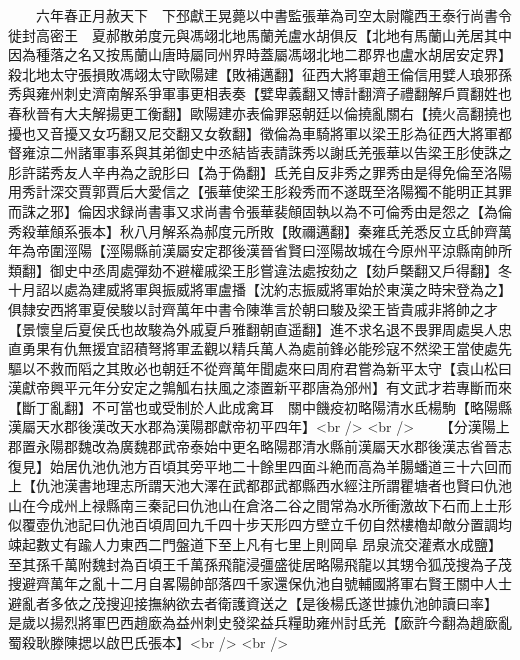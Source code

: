 　　六年春正月赦天下　下邳獻王晃薨以中書監張華為司空太尉隴西王泰行尚書令徙封高密王　夏郝散弟度元與馮翊北地馬蘭羌盧水胡俱反【北地有馬蘭山羌居其中因為種落之名又按馬蘭山唐時屬同州界時蓋屬馮翊北地二郡界也盧水胡居安定界】殺北地太守張損敗馮翊太守歐陽建【敗補邁翻】征西大將軍趙王倫信用嬖人琅邪孫秀與雍州刺史濟南解系爭軍事更相表奏【嬖卑義翻又博計翻濟子禮翻解戶買翻姓也春秋晉有大夫解揚更工衡翻】歐陽建亦表倫罪惡朝廷以倫撓亂關右【撓火高翻撓也擾也又音擾又女巧翻又尼交翻又女敎翻】徵倫為車騎將軍以梁王肜為征西大將軍都督雍涼二州諸軍事系與其弟御史中丞結皆表請誅秀以謝氐羌張華以告梁王肜使誅之肜許諾秀友人辛冉為之說肜曰【為于偽翻】氐羌自反非秀之罪秀由是得免倫至洛陽用秀計深交賈郭賈后大愛信之【張華使梁王肜殺秀而不遂既至洛陽獨不能明正其罪而誅之邪】倫因求録尚書事又求尚書令張華裴頠固執以為不可倫秀由是怨之【為倫秀殺華頠系張本】秋八月解系為郝度元所敗【敗禰邁翻】秦雍氐羌悉反立氐帥齊萬年為帝圍涇陽【涇陽縣前漢屬安定郡後漢晉省賢曰涇陽故城在今原州平涼縣南帥所類翻】御史中丞周處彈劾不避權戚梁王肜嘗違法處按劾之【劾戶槩翻又戶得翻】冬十月詔以處為建威將軍與振威將軍盧播【沈約志振威將軍始於東漢之時宋登為之】俱隸安西將軍夏侯駿以討齊萬年中書令陳準言於朝曰駿及梁王皆貴戚非將帥之才【景懷皇后夏侯氏也故駿為外戚夏戶雅翻朝直遥翻】進不求名退不畏罪周處吳人忠直勇果有仇無援宜詔積弩將軍孟觀以精兵萬人為處前鋒必能殄寇不然梁王當使處先驅以不救而䧟之其敗必也朝廷不從齊萬年聞處來曰周府君嘗為新平太守【袁山松曰漢獻帝興平元年分安定之鶉觚右扶風之漆置新平郡唐為邠州】有文武才若專斷而來【斷丁亂翻】不可當也或受制於人此成禽耳　關中饑疫初略陽清水氐楊駒【略陽縣漢屬天水郡後漢改天水郡為漢陽郡獻帝初平四年】<br />
<br />
　　【分漢陽上郡置永陽郡魏改為廣魏郡武帝泰始中更名略陽郡清水縣前漢屬天水郡後漢志省晉志復見】始居仇池仇池方百頃其旁平地二十餘里四面斗絶而高為羊腸蟠道三十六回而上【仇池漢書地理志所謂天池大澤在武都郡武都縣西水經注所謂瞿塘者也賢曰仇池山在今成州上禄縣南三秦記曰仇池山在倉洛二谷之間常為水所衝激故下石而上土形似覆壺仇池記曰仇池百頃周回九千四十步天形四方壁立千仞自然樓櫓却敵分置調均竦起數丈有踰人力東西二門盤道下至上凡有七里上則岡阜昂泉流交灌煮水成鹽】至其孫千萬附魏封為百頃王千萬孫飛龍浸彊盛徙居略陽飛龍以其甥令狐茂搜為子茂搜避齊萬年之亂十二月自畧陽帥部落四千家還保仇池自號輔國將軍右賢王關中人士避亂者多依之茂搜迎接撫納欲去者衛護資送之【是後楊氏遂世據仇池帥讀曰率】　是歲以揚烈將軍巴西趙廞為益州刺史發梁益兵糧助雍州討氐羌【廞許今翻為趙廞亂蜀殺耿滕陳揌以啟巴氏張本】<br />
<br />
